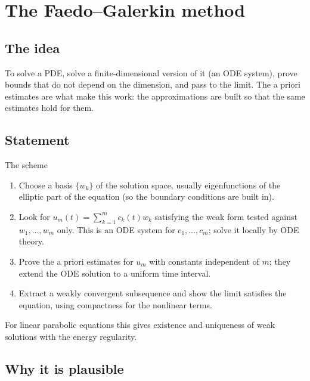 
\section{The Faedo--Galerkin method}\label{p:galerkin}


\subsection*{The idea}

To solve a PDE, solve a finite-dimensional version of it (an ODE system), prove bounds that do not depend on the dimension, and pass to the limit. The a priori estimates are what make this work: the approximations are built so that the same estimates hold for them.

\subsection*{Statement}

\begin{thmbox}{The scheme}
%
\begin{enumerate}
\item Choose a basis $\{w_k\}$ of the solution space, usually eigenfunctions of the elliptic part of the equation (so the boundary conditions are built in).
\item Look for $u_m(t)=\sum_{k=1}^m c_k(t)w_k$ satisfying the weak form tested against $w_1,\dots,w_m$ only. This is an ODE system for $c_1,\dots,c_m$; solve it locally by ODE theory.
\item Prove the a priori estimates for $u_m$ with constants independent of $m$; they extend the ODE solution to a uniform time interval.
\item Extract a weakly convergent subsequence and show the limit satisfies the equation, using compactness for the nonlinear terms.
\end{enumerate}

For linear parabolic equations this gives existence and uniqueness of weak solutions with the energy regularity.
\end{thmbox}

\subsection*{Why it is plausible}

